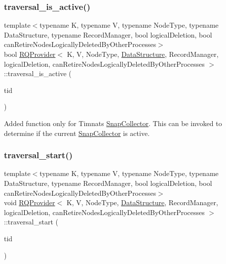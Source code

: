 \mbox{\label{classRQProvider_a2b3447faaadd49584769001cfdd4f564}} 
\subsubsection{\texorpdfstring{traversal\+\_\+is\+\_\+active()}{traversal\_is\_active()}}
{\footnotesize\ttfamily template$<$typename K, typename V, typename Node\+Type, typename Data\+Structure, typename Record\+Manager, bool logical\+Deletion, bool can\+Retire\+Nodes\+Logically\+Deleted\+By\+Other\+Processes$>$ \\
bool \hyperlink{classRQProvider}{R\+Q\+Provider}$<$ K, V, Node\+Type, \hyperlink{classDataStructure}{Data\+Structure}, Record\+Manager, logical\+Deletion, can\+Retire\+Nodes\+Logically\+Deleted\+By\+Other\+Processes $>$\+::traversal\+\_\+is\+\_\+active (\begin{DoxyParamCaption}\item[{const int}]{tid }\end{DoxyParamCaption})\hspace{0.3cm}{\ttfamily [inline]}}

Added function only for Timnat\textquotesingle{}s \hyperlink{classSnapCollector}{Snap\+Collector}. This can be invoked to determine if the current \hyperlink{classSnapCollector}{Snap\+Collector} is active. \mbox{\label{classRQProvider_a96fe481c7ba6b30efbd90ac1eca1e788}} 
\subsubsection{\texorpdfstring{traversal\+\_\+start()}{traversal\_start()}\hspace{0.1cm}{\footnotesize\ttfamily [1/5]}}
{\footnotesize\ttfamily template$<$typename K, typename V, typename Node\+Type, typename Data\+Structure, typename Record\+Manager, bool logical\+Deletion, bool can\+Retire\+Nodes\+Logically\+Deleted\+By\+Other\+Processes$>$ \\
void \hyperlink{classRQProvider}{R\+Q\+Provider}$<$ K, V, Node\+Type, \hyperlink{classDataStructure}{Data\+Structure}, Record\+Manager, logical\+Deletion, can\+Retire\+Nodes\+Logically\+Deleted\+By\+Other\+Processes $>$\+::traversal\+\_\+start (\begin{DoxyParamCaption}\item[{const int}]{tid }\end{DoxyParamCaption})\hspace{0.3cm}{\ttfamily [inline]}}

